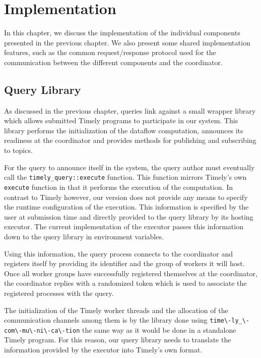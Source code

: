 \chapter{Implementation}\label{ch:impl}

In this chapter, we discuss the implementation of the individual components
presented in the previous chapter. We also present some shared implementation
features, such as the common request/response protocol used for the
communication between the different components and the coordinator.

\section{Query Library}

As discussed in the previous chapter, queries link against a small wrapper library
which allows submitted Timely programs to participate in our system.
This library performs the initialization of the dataflow computation,
announces its readiness at the coordinator and provides methods for
publishing and subscribing to topics.

For the query to announce itself in the system, the query author must eventually
call the \lstinline{timely_query::execute} function. This function
mirrors Timely's own \lstinline{execute} function in that it performs the execution
of the computation. In contrast to Timely however, our version does not provide
any means to specify the runtime configuration of the execution. This information
is specified by the user at submission time and directly provided to the query library
by its hosting executor. The current implementation of the executor passes
this information down to the query library in environment variables. 

Using this information, the query process connects to the coordinator and registers
itself by providing its identifier and the group of workers it will host. Once
all worker groups have successfully registered themselves at the coordinator,
the coordinator replies with a randomized token which is used to associate
the registered processes with the query.

The initialization of the Timely worker threads and the allocation of the
communication channels among them is by the library done using
\lstinline{time\-ly_\-com\-mu\-ni\-ca\-tion} the same way as it would be done
in a standalone Timely program. For this reason, our query library needs to
translate the information provided by the executor into Timely's own format.

